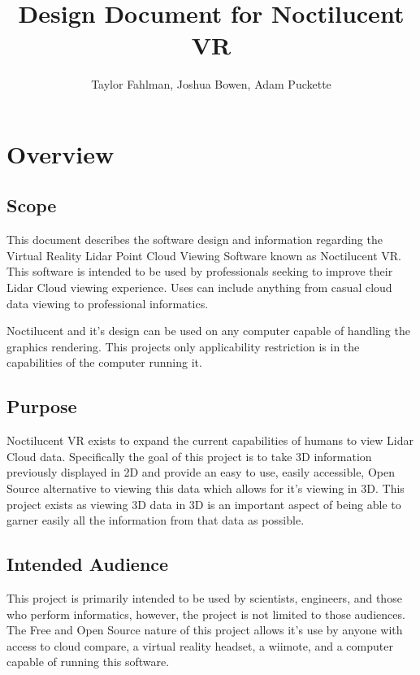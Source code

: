 \documentclass{article}
\begin{document}
\title {Design Document for Noctilucent VR}
\author {Taylor Fahlman, Joshua Bowen, Adam Puckette}

\maketitle

\abstract

\newpage
\thispagestyle{empty}

\tableofcontents

\newpage
\thispagestyle{empty}
\mbox{}

\section{Overview}
\subsection{Scope}

This document describes the software design and information regarding the Virtual Reality Lidar Point Cloud Viewing Software known as Noctilucent VR.
This software is intended to be used by professionals seeking to improve their Lidar Cloud viewing experience.
Uses can include anything from casual cloud data viewing to professional informatics.

Noctilucent and it's design can be used on any computer capable of handling the graphics rendering.
This projects only applicability restriction is in the capabilities of the computer running it.

\subsection{Purpose}

Noctilucent VR exists to expand the current capabilities of humans to view Lidar Cloud data.
Specifically the goal of this project is to take 3D information previously displayed in 2D and provide an easy to use, easily accessible, Open Source alternative to viewing this data which allows for it's viewing in 3D.
This project exists as viewing 3D data in 3D is an important aspect of being able to garner easily all the information from that data as possible.

\subsection{Intended Audience}

This project is primarily intended to be used by scientists, engineers, and those who perform informatics, however, the project is not limited to those audiences.
The Free and Open Source nature of this project allows it's use by anyone with access to cloud compare, a virtual reality headset, a wiimote, and a computer capable of running this software.
\end{document}
